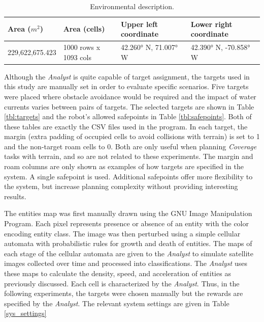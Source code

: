 \documentclass{tamuccthesis}
\begin{document}
\begin{table}[H]\small
    \begin{tabular}{|l|l|l|l|}
\hline
Area ($m^2$) & Area (cells) & Upper left coordinate & Lower right coordinate \\
\hline
229,622,675.423 & 1000 rows x 1093 cols  &  42.260° N, 71.007° W & 42.390° N, -70.858° W \\
\hline
    \end{tabular}
    \caption[Environmental description.]{Environmental description.}
    \label{tbl:env_desc}
\end{table}


Although the \textit{\textit{Analyst}} is quite capable of target assignment, the targets used in this study are manually set in order to evaluate specific scenarios. Five targets were placed where obstacle avoidance would be required and the impact of water currents varies between pairs of targets. The selected targets are shown in Table \ref{tbl:targets} and the robot's allowed safepoints in Table \ref{tbl:safepoints}. Both of these tables are exactly the CSV files used in the program. In each target, the margin (extra padding of occupied cells to avoid collisions with terrain) is set to 1 and the non-target roam cells to 0. Both are only useful when planning \textit{Coverage} tasks with terrain, and so are not related to these experiments. The margin and roam columns are only shown as examples of how targets are specified in the system. A single safepoint is used. Additional safepoints offer more flexibility to the system, but increase planning complexity without providing interesting results. 

The entities map was first manually drawn using the GNU Image Manipulation Program. Each pixel represents presence or absence of an entity with the color encoding entity class. The image was then perturbed using a simple cellular automata with probabilistic rules for growth and death of entities. The maps of each stage of the cellular automata are given to the \textit{\textit{Analyst}} to simulate satellite images collected over time and processed into classifications. The \textit{\textit{Analyst}} uses these maps to calculate the density, speed, and acceleration of entities as previously discussed. Each cell is characterized by the \textit{\textit{Analyst}}. Thus, in the following experiments, the targets were chosen manually but the rewards are specified by the \textit{\textit{Analyst}}. The relevant system settings are given in Table \ref{sys_settings}
\end{document}
